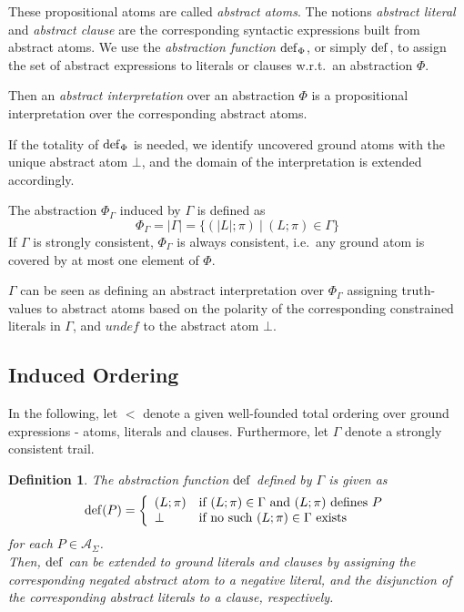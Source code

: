 \documentclass[a4paper]{article}
\newcommand{\leaveabit}{\\[6 pt]}
\newtheorem{defi}{Definition}[section]
\begin{document}
These propositional atoms are called \emph{abstract atoms}. 
The notions \emph{abstract literal} and \emph{abstract clause} are the corresponding syntactic expressions built from abstract atoms.
We use the \emph{abstraction function} $\operatorname{def}_{\Phi}$, or simply $\operatorname{def}$, to assign the set of abstract expressions to literals or clauses w.r.t.\
an abstraction $\Phi$.

Then an \emph{abstract interpretation} over an abstraction $\Phi$ is a propositional interpretation over the corresponding abstract atoms. 

If the totality of $\operatorname{def}_{\Phi}$ is needed, we identify uncovered ground atoms with the unique abstract atom $\bot$, and the domain of the interpretation is 
extended accordingly.

The abstraction $\Phi_{\Gamma}$ induced by $\Gamma$ is defined as
\[\Phi_{\Gamma} = |\Gamma| = \{(|L|; \pi)~|~(L; \pi) \in \Gamma\}\]
If $\Gamma$ is strongly consistent, $\Phi_{\Gamma}$ is always consistent, i.e.\ 
any ground atom is covered by at most one element of $\Phi$.

$\Gamma$ can be seen as defining an abstract interpretation over $\Phi_{\Gamma}$ assigning truth-values to abstract 
atoms based on the polarity of the corresponding constrained literals in $\Gamma$, and $undef$ to the abstract atom $\bot$.
% 

\subsection{Induced Ordering}
In the following, let $<$ denote a given well-founded total ordering over ground expressions - atoms, literals and clauses. 
Furthermore, let $\Gamma$ denote a strongly consistent trail.

\begin{defi} The \emph{abstraction function $\operatorname{def}$ defined by $\Gamma$} is given as
\[\operatorname{def}(P) = 
\left\{
	\begin{array}{ll}
		(L;\pi)  & \mbox{if } (L;\pi) \in \Gamma\text{~and~$(L;\pi)$ defines $P$} \\
		\bot & \mbox{if no such $(L;\pi) \in \Gamma$ exists }
	\end{array}
\right.
\]
for each $P \in \mathcal{A}_{\Sigma}$.\leaveabit
Then, $\operatorname{def}$ can be extended to ground literals and clauses by
assigning the corresponding negated abstract atom to a negative literal, and the disjunction 
of the corresponding abstract literals to a clause, respectively.
\end{defi}
\end{document}
